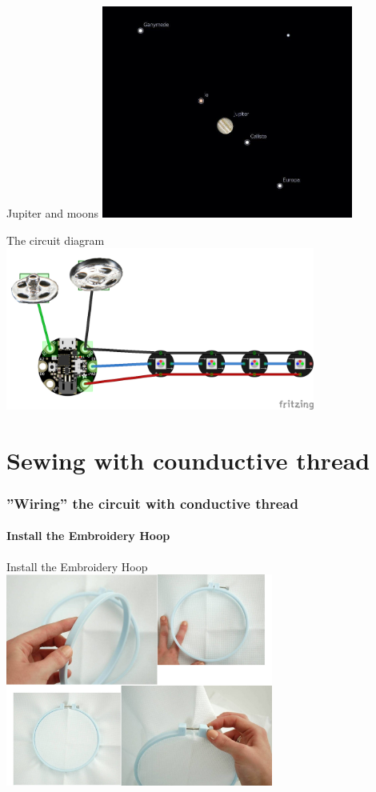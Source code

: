 \documentclass[aspectratio=169]{beamer}
\begin{document}
\begin{frame}[fragile]{Jupiter and moons}
\includegraphics[height=2.75in]{Jupiter-and-moons-58b82f8c3df78c060e64eb8b.jpg}
\end{frame}
\begin{frame}[fragile]{The circuit diagram}
\includegraphics[width=4in]{CircuitDiagram_bb.png}
\end{frame}
\part{Sewing with counductive thread}
\section{''Wiring'' the circuit with conductive thread}
\frame{\tableofcontents[hideothersubsections,sectionstyle=show/hide]}
\subsection{Install the Embroidery Hoop}
\begin{frame}[fragile]{Install the Embroidery Hoop}
\includegraphics[height=2.75in]{InstallEmbroideryHoop.jpg}
\end{frame} 
\end{document}
